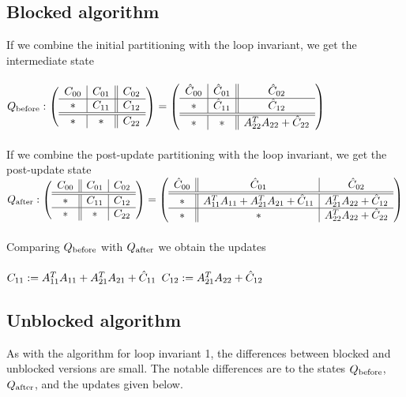 \subsection{Blocked algorithm}
If we combine the initial partitioning with the loop invariant, we get the intermediate state
\\
\\
$
Q_{\rm before}:
\left( \begin{array}{c | c || c}  C_{00}  &  C_{01}  &  C_{02}  \\ \hline  *  &  C_{11}  &  C_{12}  \\ \hline \hline  *  &  *  &  C_{22}  \end{array} \right)
=
\left( \begin{array}{c | c || c}  \hat{C}_{00}  &  \hat{C}_{01}  &  \hat{C}_{02}  \\ \hline  *  &  \hat{C}_{11}  &  \hat{C}_{12}  \\ \hline \hline  *  &  *  &  A_{22}^T A_{22} + \hat{C}_{22}  \end{array} \right)
$
\\
\\
If we combine the post-update partitioning with the loop invariant, we get the post-update state
\\
$\\
Q_{\rm after}:
\left( \begin{array}{c || c | c}  C_{00}  &  C_{01}  &  C_{02}  \\ \hline \hline  *  &  C_{11}  &  C_{12}  \\ \hline  *  &  *  &  C_{22}  \end{array} \right)
=
\left( \begin{array}{c || c | c}  \hat{C}_{00}  &  \hat{C}_{01}  &  \hat{C}_{02}  \\ \hline \hline  *  &  A_{11}^T A_{11} + A_{21}^T A_{21} + \hat{C}_{11}  &  A_{21}^T A_{22} + \hat{C}_{12}  \\ \hline  *  &  *  &  A_{22}^T A_{22} + \hat{C}_{22}  \end{array} \right)
$
\\
\\
Comparing $Q_{\rm before}$ with $Q_{\rm after}$ we obtain the updates
\\
\\
$C_{11} := A_{11}^T A_{11} + A_{21}^T A_{21} + \hat{C}_{11} \\$
$C_{12} := A_{21}^T A_{22} + \hat{C}_{12}$
\\

\subsection{Unblocked algorithm}

As with the algorithm for loop invariant 1, the differences between blocked and unblocked versions are small.
The notable differences are to the states $ Q_{\rm before} $, $ Q_{\rm after} $, and the updates given below.

